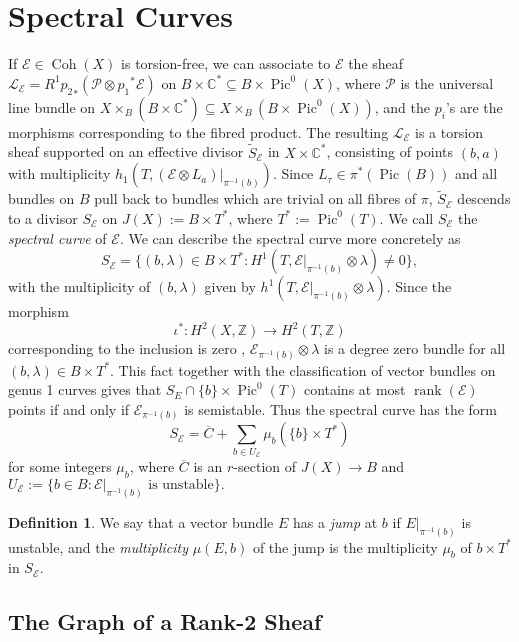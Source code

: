 \documentclass{article}[12pt]
\theoremstyle{definition}
\newtheorem{definition}[theorem]{Definition}
\theoremstyle{remark}
\newcommand \Z{\mathbb Z}
\newcommand \C{\mathbb C}
\numberwithin{equation}{section}
\newcommand \mc{\mathcal}
\DeclareMathOperator{\Pic}{Pic}
\DeclareMathOperator{\rank}{rank}
\DeclareMathOperator{\Coh}{Coh}
\begin{document}
\section{Spectral Curves}\label{Spectral}
If $\mc{E} \in \Coh(X)$ is torsion-free, we can associate to $\mc{E}$ the sheaf $\mc{L}_{\mc{E}}=R^1{p_2}_*(\mc{P}\otimes {p_1}^*\mc{E})$ on $B\times \C^*\subseteq B\times \Pic^0(X)$, where $\mc{P}$ is the universal line bundle on $X\times_B (B\times \C^*)\subseteq X\times_B(B\times \Pic^0(X))$, and the $p_i$'s are the morphisms corresponding to the fibred product. The resulting $\mc{L}_{\mc{E}}$ is a torsion sheaf supported on an effective divisor $\tilde{S}_{\mc{E}}$ in $X\times \C^*$, consisting of points $(b,a)$ with multiplicity $h_1(T, (\mc{E}\otimes L_a)|_{\pi^{-1}(b)})$. Since $L_\tau \in \pi^*(\Pic(B))$ and all bundles on $B$ pull back to bundles which are trivial on all fibres of $\pi$, $\tilde{S}_{\mc{E}}$ descends to a divisor $S_{\mc{E}}$ on $J(X):=B\times T^*$, where $T^*:=\Pic^0(T)$. We call $S_{\mc{E}}$ the \emph{spectral curve} of $\mc{E}$. We can describe the spectral curve more concretely as $$S_{\mc{E}}=\{(b,\lambda) \in B\times T^*: H^1(T, \mc{E}|_{\pi^{-1}(b)}\otimes \lambda)\neq 0\},$$ with the multiplicity of $(b,\lambda)$ given by $h^1(T, \mc{E}|_{\pi^{-1}(b)}\otimes \lambda)$. Since the morphism $$\iota^*:H^2(X,\Z)\to H^2(T,\Z)$$ corresponding to the inclusion is zero \cite{Teleman}, $\mc{E}_{\pi^{-1}(b)}\otimes \lambda$ is a degree zero bundle for all $(b,\lambda) \in B\times T^*$. This fact together with the classification of vector bundles on genus 1 curves gives that $S_E\cap \{b\}\times \Pic^0(T)$ contains at most $\rank(\mc{E})$ points if and only if $\mc{E}_{\pi^{-1}(b)}$ is semistable. Thus the spectral curve has the form $$S_{\mc{E}}=\overline{C}+\sum\limits_{b \in U_{\mc{E}}}\mu_b(\{b\}\times T^*)$$
for some integers $\mu_b$, where $\overline{C}$ is an $r$-section of $J(X)\to B$ and $U_{\mc{E}}:=\{b \in B: \mc{E}|_{\pi^{-1}(b)} \text{ is unstable}\}.$
\begin{definition}
	We say that a vector bundle $E$ has a \emph{jump} at $b$ if $E|_{\pi^{-1}(b)}$ is unstable, and the \emph{multiplicity} $\mu(E,b)$ of the jump is the multiplicity $\mu_b$ of $b\times T^*$ in $S_\mc{E}$.
\end{definition}
\subsection{The Graph of a Rank-2 Sheaf}
\end{document}
